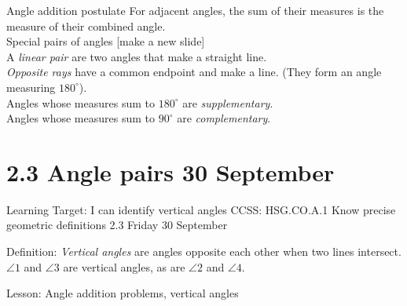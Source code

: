 \begin{frame}{Angle addition postulate}
    For adjacent angles, the sum of their measures is the measure of their combined angle.\\
    Special pairs of angles [make a new slide]\\
    A \emph{linear pair} are two angles that make a straight line. \\
    \emph{Opposite rays} have a common endpoint and make a line. (They form an angle measuring $180^\circ$).\\
    Angles whose measures sum to $180^\circ$ are \emph{supplementary}. \\
    Angles whose measures sum to $90^\circ$ are \emph{complementary}.
    \begin{center}
      \end{center}
\end{frame}

\section{2.3 Angle pairs \hfill 30 September}
\begin{frame}{Learning Target: I can identify vertical angles}
  {CCSS: HSG.CO.A.1 Know precise geometric definitions  \hfill \alert{2.3 Friday 30 September}}
  
    Definition: \emph{Vertical angles} are angles opposite each other when two lines intersect. $\angle 1$ and $\angle 3$ are vertical angles, as are $\angle 2$ and $\angle 4$.
  \begin{center}
  \end{center}
    Lesson: Angle addition problems, vertical angles
  \end{frame}
  
